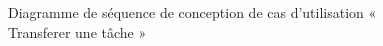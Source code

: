 \begin{figure}[H]
  \centering
  \caption{Diagramme de séquence de conception de cas d'utilisation « Transferer une tâche »}
  \label{fig:sequence_conception_transferTask}
\end{figure}
